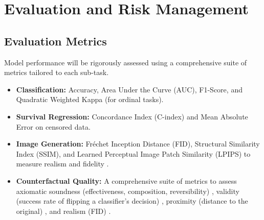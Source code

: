 \documentclass[11pt, a4paper]{article}
\begin{document}
\section{Evaluation and Risk Management}
\subsection{Evaluation Metrics}
Model performance will be rigorously assessed using a comprehensive suite of metrics tailored to each sub-task.
\begin{itemize}
    \item \textbf{Classification:} Accuracy, Area Under the Curve (AUC), F1-Score, and Quadratic Weighted Kappa (for ordinal tasks).
    \item \textbf{Survival Regression:} Concordance Index (C-index) and Mean Absolute Error on censored data.
    \item \textbf{Image Generation:} Fréchet Inception Distance (FID), Structural Similarity Index (SSIM), and Learned Perceptual Image Patch Similarity (LPIPS) to measure realism and fidelity \cite{VigneshwaranOhara2024, Singla2022, LiShi2023, MoroSantinha2024, RossiLopez2024}.
    \item \textbf{Counterfactual Quality:} A comprehensive suite of metrics to assess axiomatic soundness (effectiveness, composition, reversibility) \cite{KomanduriWu2023, MonteiroRibeiro2023}, validity (success rate of flipping a classifier’s decision) \cite{SinglaEslami2021, Singla2022}, proximity (distance to the original) \cite{GuoDeng2024}, and realism (FID) \cite{VigneshwaranOhara2024, Singla2022}.
\end{itemize}
\end{document}
